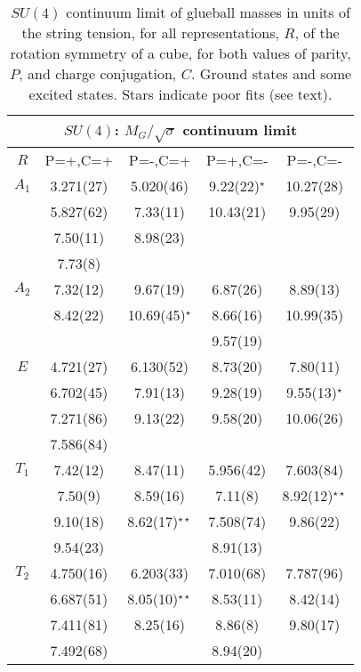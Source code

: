 \documentclass[12pt]{article}
\begin{document}
\begin{table}[htb]
\centering
\begin{tabular}{|c|c|c|c|c|} \hline
\multicolumn{5}{|c|}{$SU(4)$: $M_G/\surd\sigma$  continuum limit} \\ \hline
  $R$   & P=+,C=+ & P=-,C=+ &  P=+,C=-   &  P=-,C=-   \\ \hline
$A_1$  & 3.271(27)  & 5.020(46) & 9.22(22)$^\star$  & 10.27(28)  \\
    & 5.827(62)  & 7.33(11)  & 10.43(21) & 9.95(29)  \\
    & 7.50(11)   & 8.98(23)  &           &   \\
    & 7.73(8)    &           &           &   \\ \hline
$A_2$  & 7.32(12)   & 9.67(19)  & 6.87(26)  & 8.89(13)  \\
    & 8.42(22)   & 10.69(45)$^\star$ & 8.66(16) & 10.99(35)  \\
    &            &           & 9.57(19)  &   \\ \hline
$E$   & 4.721(27)  & 6.130(52) & 8.73(20)  & 7.80(11)  \\
    & 6.702(45)  & 7.91(13)  & 9.28(19)  & 9.55(13)$^\star$  \\
    & 7.271(86)  & 9.13(22)  & 9.58(20)  & 10.06(26)  \\
    & 7.586(84)  &           &           &   \\ \hline
$T_1$  & 7.42(12)   & 8.47(11)  & 5.956(42) & 7.603(84)  \\
    & 7.50(9)    & 8.59(16)  & 7.11(8)   & 8.92(12)$^{\star\star}$  \\
    & 9.10(18)   & 8.62(17)$^{\star\star}$ & 7.508(74) & 9.86(22) \\
    & 9.54(23)   &           & 8.91(13)  &            \\ \hline
$T_2$  & 4.750(16)  & 6.203(33) & 7.010(68) & 7.787(96)  \\
    & 6.687(51)  & 8.05(10)$^{\star\star}$ & 8.53(11) & 8.42(14)  \\
    & 7.411(81)  & 8.25(16)  & 8.86(8)   & 9.80(17)    \\
    & 7.492(68)  &           & 8.94(20)  &             \\ \hline
\end{tabular}
\caption{$SU(4)$ continuum limit of glueball masses in units of the string tension,
  for all representations, $R$, of the rotation symmetry of a cube, for
  both values of parity, $P$, and charge conjugation, $C$.
  Ground states and some excited states. Stars
  indicate poor fits (see text).}
\label{table_MK_R_SU4}
\end{table}
\end{document}
